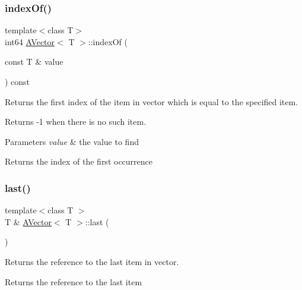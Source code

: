 \subsubsection{\texorpdfstring{indexOf()}{indexOf()}}
{\footnotesize\ttfamily template$<$class T$>$ \\
int64 \mbox{\hyperlink{class_a_vector}{A\+Vector}}$<$ T $>$\+::index\+Of (\begin{DoxyParamCaption}\item[{const T \&}]{value }\end{DoxyParamCaption}) const}



Returns the first index of the item in vector which is equal to the specified item. 

Returns -\/1 when there is no such item.


\begin{DoxyParams}{Parameters}
{\em value} & the value to find \\
\hline
\end{DoxyParams}
\begin{DoxyReturn}{Returns}
the index of the first occurrence 
\end{DoxyReturn}
\mbox{\label{class_a_vector_a0465c474ee53f57eb8817a531ac530b2}} 
\subsubsection{\texorpdfstring{last()}{last()}\hspace{0.1cm}{\footnotesize\ttfamily [1/2]}}
{\footnotesize\ttfamily template$<$class T $>$ \\
T \& \mbox{\hyperlink{class_a_vector}{A\+Vector}}$<$ T $>$\+::last (\begin{DoxyParamCaption}{ }\end{DoxyParamCaption})}



Returns the reference to the last item in vector. 

\begin{DoxyReturn}{Returns}
the reference to the last item 
\end{DoxyReturn}
\mbox{\label{class_a_vector_afbdc200be19695bebbbc54dce5693f98}} 
